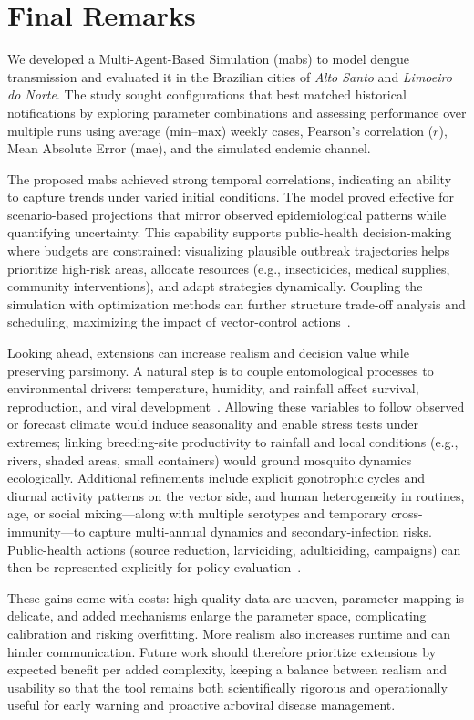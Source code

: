 \section{Final Remarks}\label{sec:final-remarks}

We developed a Multi-Agent-Based Simulation (\gls{mabs}) to model dengue transmission and evaluated it in the Brazilian cities of \textit{Alto Santo} and \textit{Limoeiro do Norte}. The study sought configurations that best matched historical notifications by exploring parameter combinations and assessing performance over multiple runs using average (min–max) weekly cases, Pearson’s correlation ($r$), Mean Absolute Error (\gls{mae}), and the simulated endemic channel.

The proposed \gls{mabs} achieved strong temporal correlations, indicating an ability to capture trends under varied initial conditions. The model proved effective for scenario-based projections that mirror observed epidemiological patterns while quantifying uncertainty. This capability supports public-health decision-making where budgets are constrained: visualizing plausible outbreak trajectories helps prioritize high-risk areas, allocate resources (e.g., insecticides, medical supplies, community interventions), and adapt strategies dynamically. Coupling the simulation with optimization methods can further structure trade-off analysis and scheduling, maximizing the impact of vector-control actions~\cite{araujo:2022,andrade:2021}.

Looking ahead, extensions can increase realism and decision value while preserving parsimony. A natural step is to couple entomological processes to environmental drivers: temperature, humidity, and rainfall affect survival, reproduction, and viral development~\cite{maneerat:2016,Abidemi2020,hamdan:2021}. Allowing these variables to follow observed or forecast climate would induce seasonality and enable stress tests under extremes; linking breeding-site productivity to rainfall and local conditions (e.g., rivers, shaded areas, small containers) would ground mosquito dynamics ecologically. Additional refinements include explicit gonotrophic cycles and diurnal activity patterns on the vector side, and human heterogeneity in routines, age, or social mixing—along with multiple serotypes and temporary cross-immunity—to capture multi-annual dynamics and secondary-infection risks. Public-health actions (source reduction, larviciding, adulticiding, campaigns) can then be represented explicitly for policy evaluation~\cite{Abidemi2020}.

These gains come with costs: high-quality data are uneven, parameter mapping is delicate, and added mechanisms enlarge the parameter space, complicating calibration and risking overfitting. More realism also increases runtime and can hinder communication. Future work should therefore prioritize extensions by expected benefit per added complexity, keeping a balance between realism and usability so that the tool remains both scientifically rigorous and operationally useful for early warning and proactive arboviral disease management.
